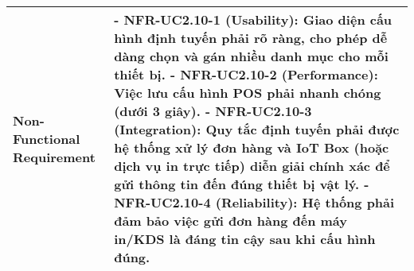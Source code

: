 \begin{longtable}{|m{4cm}|p{11cm}|}
\hline
Non-Functional Requirement & - \textbf{NFR-UC2.10-1 (Usability):} Giao diện cấu hình định tuyến phải rõ ràng, cho phép dễ dàng chọn và gán nhiều danh mục cho mỗi thiết bị. \newline - \textbf{NFR-UC2.10-2 (Performance):} Việc lưu cấu hình POS phải nhanh chóng (dưới 3 giây). \newline - \textbf{NFR-UC2.10-3 (Integration):} Quy tắc định tuyến phải được hệ thống xử lý đơn hàng và IoT Box (hoặc dịch vụ in trực tiếp) diễn giải chính xác để gửi thông tin đến đúng thiết bị vật lý. \newline - \textbf{NFR-UC2.10-4 (Reliability):} Hệ thống phải đảm bảo việc gửi đơn hàng đến máy in/KDS là đáng tin cậy sau khi cấu hình đúng. \\
\hline

\end{longtable}


